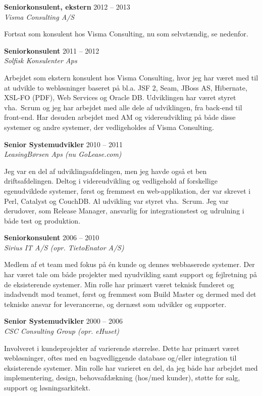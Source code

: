 \documentclass[a4paper,11pt]{article}
\begin{document}
\smallskip

\textbf{Seniorkonsulent, ekstern} \hfill 2012 -- 2013 \\
\textsl{Visma Consulting A/S}

Fortsat som konsulent hos Visma Consulting, nu som selvstændig, se
nedenfor.

\smallskip

\textbf{Seniorkonsulent} \hfill 2011 -- 2012 \\
\textsl{Solfisk Konsulenter Aps}

Arbejdet som ekstern konsulent hos Visma Consulting, hvor jeg har
været med til at udvikle to webløsninger baseret på bl.a. JSF 2, Seam,
JBoss AS, Hibernate, XSL-FO (PDF), Web Services og Oracle
DB. Udviklingen har været styret vha.\ Scrum og jeg har arbejdet med
alle dele af udviklingen, fra back-end til front-end.  Har desuden
arbejdet med AM og videreudvikling på både disse systemer og andre
systemer, der vedligeholdes af Visma Consulting.

\smallskip

\textbf{Senior Systemudvikler} \hfill 2010 -- 2011 \\
\textsl{LeasingBørsen Aps (nu GoLease.com)}

Jeg var en del af udviklingsafdelingen, men jeg havde også et ben
driftsafdelingen. Deltog i videreudvikling og vedligehold af
forskellige egenudviklede systemer, først og fremmest en
web-applikation, der var skrevet i Perl, Catalyst og CouchDB.  Al
udvikling var styret vha.\ Scrum. Jeg var derudover, som Release
Manager, ansvarlig for integrationstest og udrulning i både test og
produktion.

\smallskip

\textbf{Seniorkonsulent} \hfill 2006 -- 2010 \\
\textsl{Sirius IT A/S (opr. TietoEnator A/S)}

Medlem af et team med fokus på én kunde og dennes webbaserede
systemer. Der har været tale om både projekter med nyudvikling samt
support og fejlretning på de eksisterende systemer. Min rolle har
primært været teknisk funderet og indadvendt mod teamet, først og
fremmest som Build Master og dermed med det tekniske ansvar for
leverancerne, og dernæst som udvikler og supporter.

\smallskip

\textbf{Senior Systemudvikler} \hfill 2000 -- 2006 \\
\textsl{CSC Consulting Group (opr. eHuset)}

Involveret i kundeprojekter af varierende størrelse. Dette har primært
været webløsninger, oftes med en bagvedliggende database og/eller
integration til eksisterende systemer. Min rolle har varieret en del,
da jeg både har arbejdet med implementering, design, behovsafdækning
(hos/med kunder), støtte for salg, support og løsningsarkitekt.
\end{document}
